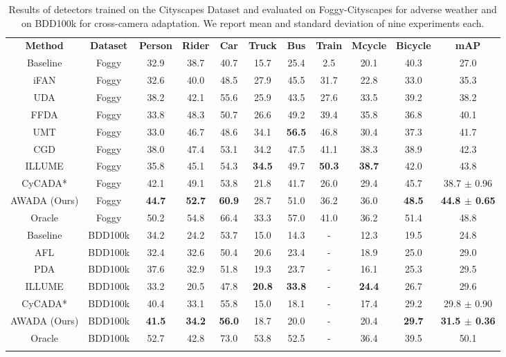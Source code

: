 \documentclass[10pt,twocolumn,letterpaper]{article}
\begin{document}
\begin{table*}[t]
	\centering
	\caption{Results of detectors trained on the Cityscapes Dataset and evaluated on Foggy-Cityscapes for adverse weather and on BDD100k for cross-camera adaptation. We report mean and standard deviation of nine experiments each.}
	\label{table:City2Foggy}
	\begin{tabular}{c|c|cccccccc|c}
		\specialrule{1.2pt}{1pt}{1pt}
		\textbf{Method} & \textbf{Dataset} &\textbf{Person} & \textbf{Rider}& \textbf{Car}& \textbf{Truck}& \textbf{Bus}& \textbf{Train}& \textbf{Mcycle}& \textbf{Bicycle}& \textbf{mAP}\\
		\specialrule{1.2pt}{1pt}{1pt}
		Baseline&Foggy&32.9&38.7&40.7&15.7&25.4&2.5&20.1&40.3&27.0\\
		\hline
		iFAN \cite{iFAN}&Foggy&32.6&40.0&48.5&27.9&45.5&31.7&22.8&33.0&35.3\\
		UDA \cite{UDA}& Foggy&38.2&42.1&55.6&25.9&43.5&27.6&33.5&39.2&38.2\\
		FFDA \cite{FFDA}&Foggy&33.8&48.3&50.7&26.6&49.2&39.4&35.8&36.8&40.1\\
		UMT \cite{UMT} & Foggy&33.0&46.7&48.6&34.1&\textbf{56.5}&46.8&30.4&37.3&41.7\\
		CGD \cite{li2021category}&Foggy&38.0&47.4&53.1&34.2&47.5&41.1&38.3&38.9&42.3\\
		ILLUME \cite{ILLUME}& Foggy &35.8&45.1&54.3&\textbf{34.5}&49.7&\textbf{50.3}&\textbf{38.7}&42.0&43.8\\
		CyCADA* \cite{menke2022}&Foggy&42.1&49.1&53.8&21.8&41.7&26.0&29.4&45.7&38.7 $\pm$ 0.96  \\
		AWADA (Ours)&Foggy&\textbf{44.7}&\textbf{52.7}&\textbf{60.9}&28.7&51.0&36.2&36.0&\textbf{48.5}&\textbf{44.8 $\pm$ 0.65}\\
		\hline
		Oracle&Foggy&50.2&54.8&66.4&33.3&57.0&41.0&36.2&51.4&48.8\\
		\specialrule{1.2pt}{1pt}{1pt}
		Baseline&BDD100k&34.2&24.2&53.7&15.0&14.3&-&12.3&19.5&24.8\\
		\hline
		AFL \cite{AFL} & BDD100k &32.4&32.6&50.4&20.6&23.4&-&18.9&25.0&29.0\\
		PDA \cite{ProgressiveDomainAdaptation}& BDD100k &37.6&32.9&51.8&19.3&23.7&-&16.1&25.3&29.5\\
		ILLUME \cite{ILLUME} & BDD100k &33.2&20.5&47.8&\textbf{20.8}&\textbf{33.8}&-&\textbf{24.4}&26.7&29.6\\
		CyCADA* \cite{menke2022}&BDD100k&40.4&33.1&55.8&15.0&18.1&-&17.4&29.2&29.8 $\pm$ 0.90\\
		AWADA (Ours)&BDD100k&\textbf{41.5}&\textbf{34.2}&\textbf{56.0}&18.7&20.0&-&20.4&\textbf{29.7}&\textbf{31.5 $\pm$ 0.36}\\
		\hline
		Oracle&BDD100k&52.7&42.8&73.0&53.8&52.5&-&36.4&39.5&50.1\\
		\specialrule{1.2pt}{1pt}{1pt}
	\end{tabular}
\end{table*}
\end{document}
